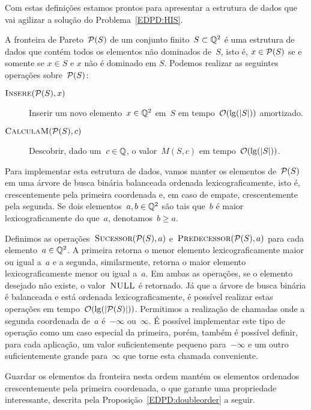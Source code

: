Com estas definições estamos prontos para apresentar a estrutura de dados que vai agilizar a solução do Problema~\ref{EDPD:HIS}.
\begin{defi} \label{EDPD:Pareto}
A fronteira de Pareto~$\mathcal{P}(S)$ de um conjunto finito~$S \subset \mathbb{Q}^2$ é uma estrutura de dados que contém todos os elementos não dominados de~$S$, isto é, $x \in \mathcal{P}(S)$ se e somente se $x \in S$ e $x$ não é dominado em $S$. Podemos realizar as seguintes operações sobre~$\mathcal{P}(S)$:

\begin{description}
\item[$\textsc{Insere}(\mathcal{P}(S),x)$] Inserir um novo elemento~$x \in \mathbb{Q}^2$ em~$S$ em tempo~$\mathcal{O}(\lg(|S|))$ amortizado.
\item[$\textsc{CalculaM}(\mathcal{P}(S),c)$] Descobrir, dado um~$c \in \mathbb{Q}$, o valor~$M(S,c)$ em tempo~$\mathcal{O}(\lg(|S|))$.
\end{description}
\end{defi}

Para implementar esta estrutura de dados, vamos manter os elementos de~$\mathcal{P}(S)$ em uma árvore de busca binária balanceada ordenada lexicograficamente, isto é, crescentemente pela primeira coordenada e, em caso de empate, crescentemente pela segunda. Se dois elementos~${ a,b \in \mathbb{Q}^2 }$ são tais que~$b$ é maior lexicograficamente do que~$a$, denotamos~${ b \geq a }$. 

Definimos as operações~$\textsc{Sucessor}(\mathcal{P}(S),a)$ e~$\textsc{Predecessor}(\mathcal{P}(S),a)$ para cada elemento~${ a \in \mathbb{Q}^2 }$. A primeira retorna o menor elemento lexicograficamente maior ou igual a~$a$ e a segunda, similarmente, retorna o maior elemento lexicograficamente menor ou igual a~$a$. Em ambas as operações, se o elemento desejado não existe, o valor~$\textsc{NULL}$ é retornado. Já que a árvore de busca binária é balanceada e está ordenada lexicograficamente, é possível realizar estas operações em tempo~$\mathcal{O}(\lg(|\mathcal{P}(S)|))$.  Permitimos a realização de chamadas onde a segunda coordenada de~$a$ é~$-\infty$ ou~$\infty$. É possível implementar este tipo de operação como um caso especial da primeira, porém, também é possível definir, para cada aplicação, um valor suficientemente pequeno para~$-\infty$ e um outro suficientemente grande para~$\infty$ que torne esta chamada conveniente.

Guardar os elementos da fronteira nesta ordem mantém os elementos ordenados crescentemente pela primeira coordenada, o que garante uma propriedade interessante, descrita pela Proposição~\ref{EDPD:doubleorder} a seguir. 

